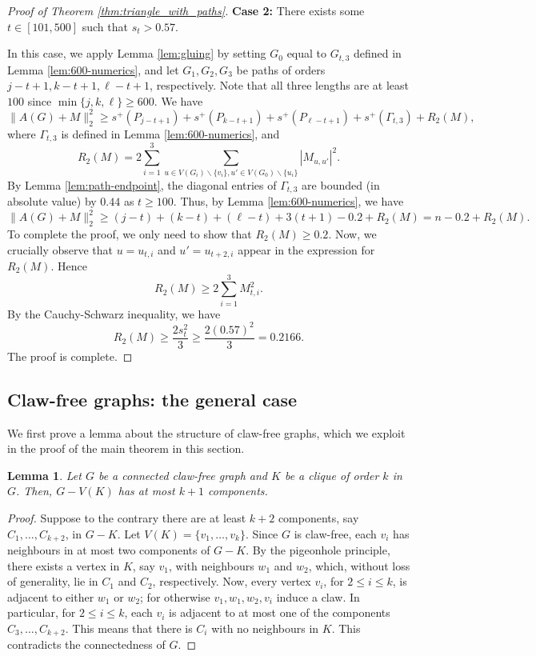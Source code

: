 \documentclass{article}
\newtheorem{lemma}{Lemma}[section]
\newcommand{\abs}[1]{|#1|}
\newcommand{\norm}[1]{\lVert#1\rVert}
\begin{document}
\begin{proof}[Proof of Theorem \ref{thm:triangle_with_paths}]
\textbf{Case 2:} There exists some $t \in [101, 500]$ such that $s_t > 0.57$.

In this case, we apply Lemma \ref{lem:gluing} by setting $G_0$ equal to $G_{t, 3}$ defined in Lemma \ref{lem:600-numerics}, and let $G_1, G_2, G_3$ be paths of orders $j - t  + 1, k - t+1, \ell - t+1$, respectively. Note that all three lengths are at least $100$ since $\min\{j,k,\ell\}\ge 600$. We have
    \[\norm{A(G) + M}_2^2 \geq s^+(P_{j - t+1}) + s^+(P_{k - t+1}) + s^+(P_{\ell - t+1})+ s^+(\Gamma_{t, 3}) + R_2(M),\]
    where $\Gamma_{t,3}$ is defined in Lemma \ref{lem:600-numerics}, and 
    \[R_2(M) = 2 \sum_{i = 1}^3 \sum_{u \in V(G_i) \backslash \{v_i\}, u' \in V(G_0) \backslash \{u_i\}} \abs{M_{u, u'}}^2.\]
By Lemma \ref{lem:path-endpoint}, the diagonal entries of $\Gamma_{t,3}$ are bounded (in absolute value) by $0.44$ as $t\ge 100$. Thus, by Lemma \ref{lem:600-numerics}, we have
    \[\norm{A(G) + M}_2^2 \ge (j - t) + (k - t) + (\ell - t) + 3(t + 1) - 0.2 + R_2(M)=n - 0.2 +R_2(M).\]
To complete the proof, we only need to show that $R_2(M)\ge 0.2$.    Now, we crucially observe that $u = u_{t, i}$ and $u' = u_{t + 2, i}$ appear in the expression for $R_2(M)$. Hence 
    \[R_2(M) \geq 2 \sum_{i = 1}^3 M_{t, i}^2.\]
By the Cauchy-Schwarz inequality, we have
    \[R_2(M) \geq \frac{2s_t^2}{3} \ge \frac{2(0.57)^2}{3} = 0.2166.\]
The proof is complete.    
\end{proof}

\subsection{Claw-free graphs: the general case}

We first prove a lemma about the structure of claw-free graphs, which we exploit in the proof of the main theorem in this section.

\begin{lemma}\label{lemma:claw_free_component}
  Let $G$ be a connected claw-free graph and $K$ be a clique of order $k$ in $G$. Then, $G-V(K)$ has at most $k+1$ components.   
\end{lemma}

\begin{proof} Suppose to the contrary there are at least $k+2$ components, say $C_1, \ldots, C_{k+2}$, in $G-K$. Let $V(K)=\{v_1, \ldots, v_k\}$. Since $G$ is claw-free, each $v_i$ has neighbours in at most two components of $G-K$. By the pigeonhole principle, there exists a vertex in $K$, say $v_1$, with neighbours $w_1$ and $w_2$, which, without loss of generality, lie in $C_1$ and $C_2$, respectively. Now, every vertex $v_i$, for $2\le i\le k$, is adjacent to either $w_1$ or $w_2$; for otherwise $v_1, w_1, w_2, v_i$ induce a claw. In particular, for $2\le i \le k$, each $v_i$ is adjacent to at most one of the components $C_3, \ldots, C_{k+2}$. This means that there is $C_i$ with no neighbours in $K$. This contradicts the connectedness of $G$.
\end{proof}
\end{document}
